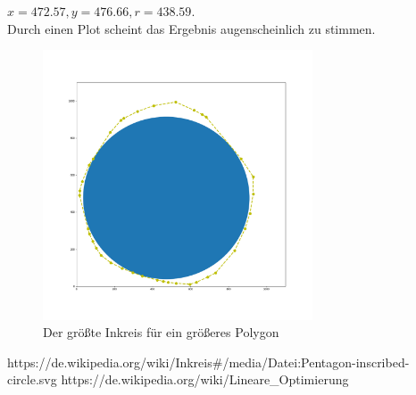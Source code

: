 \documentclass[conference]{IEEEtran}
\begin{document}
	 $x = 472.57, y = 476.66, r = 438.59$.\\
	Durch einen Plot scheint das Ergebnis augenscheinlich zu stimmen.
	\begin{figure}[h]
		\begin{center}
			\includegraphics[width=8cm]{Inscribed.png}
			\caption{Der größte Inkreis für ein größeres Polygon}
			\label{fail}
		\end{center}
	\end{figure}

	
	\begin{thebibliography}{00}
		https://de.wikipedia.org/wiki/Inkreis\#/media/Datei:Pentagon-inscribed-circle.svg
		https://de.wikipedia.org/wiki/Lineare\_Optimierung
	\end{thebibliography}
	
	
	
\end{document}
